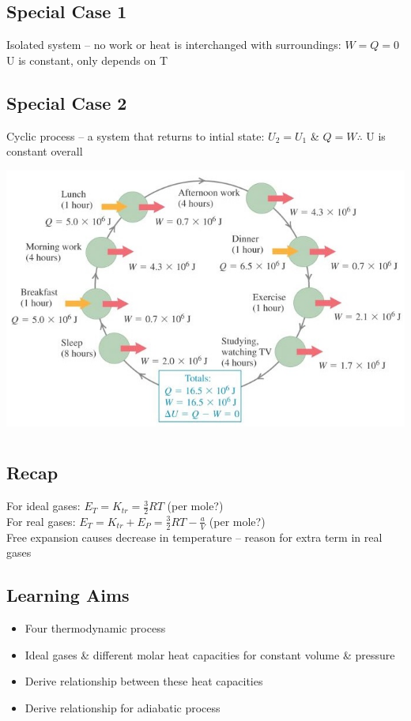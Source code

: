 \documentclass[a4paper, 11pt, fleqn, normalem]{report}
\begin{document}
\section{Special Case 1}
Isolated system -- no work or heat is interchanged with surroundings: $W = Q = 0$ \\
U is constant, only depends on T

\section{Special Case 2}
Cyclic process -- a system that returns to intial state: $U_{2} = U_{1}$ \& $Q = W \therefore$ U is constant overall

\includegraphics[scale=0.9]{Cyclic.jpg}

\chapter{}
\thispagestyle{fancy}
\section{Recap}
For ideal gases: $E_{T} = K_{tr} = \frac{3}{2}RT$ (per mole?) \\
For real gases: $E_{T} = K_{tr} + E_{P} = \frac{3}{2}RT - \frac{a}{V}$ (per mole?) \\
Free expansion causes decrease in temperature -- reason for extra term in real gases

\section{Learning Aims}
\begin{itemize}
	\item Four thermodynamic process
	\item Ideal gases \&  different molar heat capacities for constant volume \& pressure
	\item Derive relationship between these heat capacities
	\item Derive relationship for adiabatic process
\end{itemize}
\end{document}
